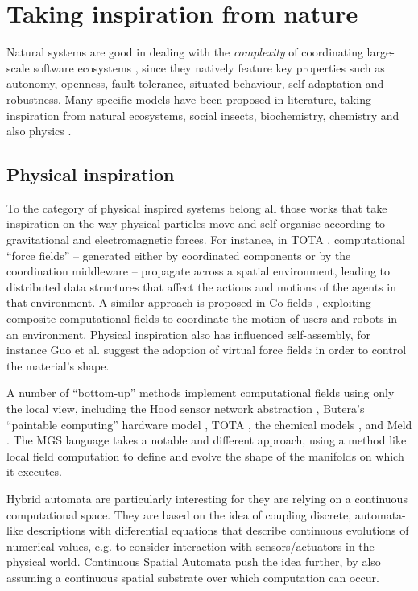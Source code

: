 \documentclass[12pt,a4paper,twoside,openright]{book}
\begin{document}
\section{Taking inspiration from nature}

Natural systems are good in dealing with the \emph{complexity} of coordinating large-scale software ecosystems \cite{nic-ieeeis19,facets,nic-cacm49}, since they natively feature key properties such as autonomy, openness, fault tolerance, situated behaviour, self-adaptation and robustness.
%
Many specific models have been proposed in literature, taking inspiration from natural ecosystems, social insects, biochemistry, chemistry and also physics \cite{ecosystems-jpcc7}.

\subsection{Physical inspiration}

To the category of physical inspired systems belong all those works that take inspiration on the way physical particles move and self-organise according to gravitational and electromagnetic forces.
%
For instance, in TOTA \cite{fieldbasedcoordination-mamei06}, computational ``force fields'' -- generated either by coordinated components or by the coordination middleware -- propagate across a spatial environment, leading to distributed data structures that affect the actions and motions of the agents in that environment.
%
A similar approach is proposed in Co-fields \cite{cofields--esawIII}, exploiting composite computational fields to coordinate the motion of users and robots in an environment.
%
Physical inspiration also has influenced self-assembly, for instance Guo et al. \cite{guo2012} suggest the adoption of virtual force fields in order to control the material's shape.

A number of ``bottom-up'' methods implement computational fields using only the local view, including the Hood sensor network abstraction \cite{hood}, Butera's ``paintable computing'' hardware model \cite{butera}, TOTA \cite{mamei2009acm}, the chemical models \cite{VCMZ-TAAS2011}, and Meld \cite{Meld}.
%
The MGS language \cite{GiavittoMGS05} takes a notable and different approach, using a method like local field computation to define and evolve the shape of the manifolds on which it executes.

Hybrid automata \cite{561342} are particularly interesting for they are relying on a continuous computational space.
%
They are based on the idea of coupling discrete, automata-like descriptions with differential equations that describe continuous evolutions of numerical values, e.g. to consider interaction with sensors/actuators in the physical world.
%
Continuous Spatial Automata \cite{maclennanCSA} push the idea further, by also assuming a continuous spatial substrate over which computation can occur.
\end{document}
